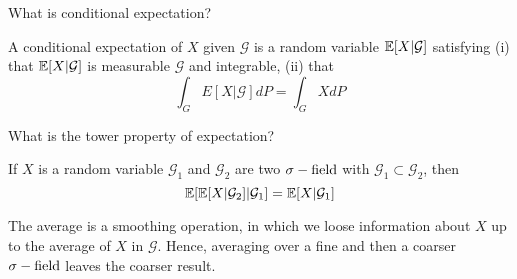 \documentclass[avery5388,grid,frame]{flashcards}
\begin{document}
\begin{flashcard}
    {What is conditional expectation?}
    \begin{definition}
        A conditional expectation of $X$ given $\mathcal G$ is a random variable $\mathbb{E}[X | \mathcal G]$ satisfying (i) that $\mathbb{E}[X | \mathcal G]$ is measurable $\mathcal G$ and integrable, (ii) that
        $$\int_G E[X | \mathcal G] dP = \int_G X dP$$
    \end{definition}
\end{flashcard}


\begin{flashcard}
    {What is the tower property of expectation?}
    \begin{theorem}
        If $X$ is a random variable $\mathcal G_1$ and $\mathcal G_2$ are two $\sigma-\text{field}$ with $\mathcal G_1 \subset \mathcal G_2$, then
        $$\mathbb{E}[\mathbb{E}[X | \mathcal G_2] | \mathcal G_1] = \mathbb{E}[X | \mathcal G_1]$$
    \end{theorem}

    \begin{remark}
        The average is a smoothing operation, in which we loose information about $X$ up to the average of $X$ in $\mathcal G$. Hence, averaging over a fine and then a coarser $\sigma-\text{field}$ leaves the coarser result.
    \end{remark}
\end{flashcard}
\end{document}
